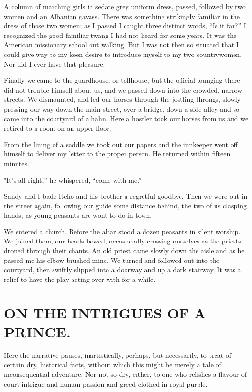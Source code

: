 \documentclass[a5paper,12pt]{book}
\begin{document}
A column of marching girls in sedate grey uniform dress, passed, followed by two women and an Albanian gavass. There was something strikingly familiar in the dress of those two women; as I passed I caught three distinct words, “Is it far?” I recognized the good familiar twang I had not heard for some years. It was the American missionary school out walking. But I was not then so situated that I could give way to my keen desire to introduce myself to my two countrywomen. Nor did I ever have that pleasure.

Finally we came to the guardhouse, or tollhouse, but the official lounging there did not trouble himself about us, and we passed down into the crowded, narrow streets. We dismounted, and led our horses through the jostling throngs, slowly pressing our way down the main street, over a bridge, down a side alley and so came into the courtyard of a hahn. Here a hostler took our horses from us and we retired to a room on an upper floor.

From the lining of a saddle we took out our papers and the innkeeper went off himself to deliver my letter to the proper person. He returned within fifteen minutes.

"It's all right,” he whispered, “come with me.”

Sandy and I bade Itcho and his brother a regretful goodbye. Then we were out in the street again, following our guide some distance behind, the two of us clasping hands, as young peasants are wont to do in town.

We entered a church. Before the altar stood a dozen peasants in silent worship. We joined them, our heads bowed, occasionally crossing ourselves as the priests droned through their chants. An old priest came slowly down the aisle and as he passed me his elbow brushed mine. We turned and followed out into the courtyard, then swiftly slipped into a doorway and up a dark stairway. It was a relief to have the play acting over with for a while.


\chapter{ON THE INTRIGUES OF A PRINCE.}

Here the narrative pauses, inartistically, perhaps, but necessarily, to treat of certain dry, historical facts, without which this might be merely a tale of inconsequential adventure. Nor not so dry, either, to one who relishes a flavour of court intrigue and human passion and greed clothed in royal purple.
\end{document}

